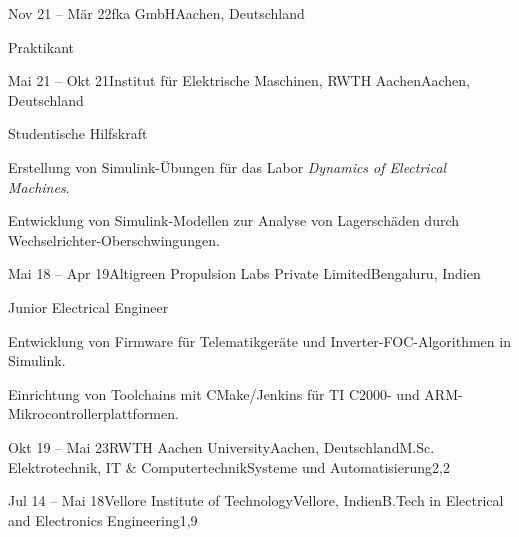 \documentclass[11pt,a4paper,lang=de]{mycv}
\begin{document}
\begin{profexperience}
\begin{experienceentry}{Nov 21 -- Mär 22}{fka GmbH}{Aachen, Deutschland}
\begin{role}{Praktikant}{}
			\end{role}
		\end{experienceentry}
		\begin{experienceentry}{Mai 21 -- Okt 21}{Institut für Elektrische Maschinen, RWTH Aachen}{Aachen, Deutschland}
			\begin{role}{Studentische Hilfskraft}{}
				\item Erstellung von Simulink-Übungen für das Labor \emph{Dynamics of Electrical Machines}.
				\item Entwicklung von Simulink-Modellen zur Analyse von Lagerschäden durch Wechselrichter-Oberschwingungen.
			\end{role}
		\end{experienceentry}
		\begin{experienceentry}{Mai 18 -- Apr 19}{Altigreen Propulsion Labs Private Limited}{Bengaluru, Indien}
			\begin{role}{Junior Electrical Engineer}{}
				\item Entwicklung von Firmware für Telematikgeräte und Inverter-FOC-Algorithmen in Simulink.
				\item Einrichtung von Toolchains mit CMake/Jenkins für TI C2000- und ARM-Mikrocontrollerplattformen.
			\end{role}
		\end{experienceentry}
	\end{profexperience}
	\begin{academics}
		\begin{acadentry}{Okt 19 -- Mai 23}{RWTH Aachen University}{Aachen, Deutschland}{M.Sc. Elektrotechnik, IT \& Computertechnik}{Systeme und Automatisierung}{2,2}
		\end{acadentry}
		\begin{acadentry}{Jul 14 -- Mai 18}{Vellore Institute of Technology}{Vellore, Indien}{B.Tech in Electrical and Electronics Engineering}{}{1,9}
		\end{acadentry}
	\end{academics}
\end{document}
